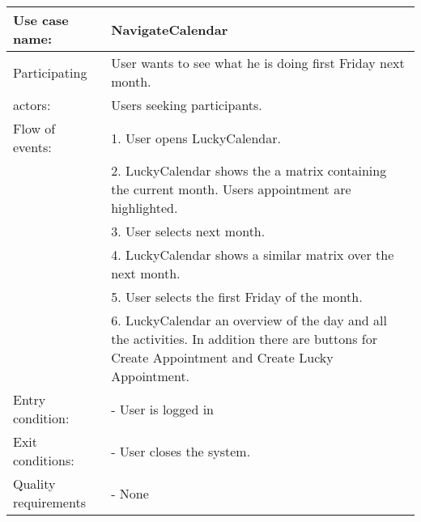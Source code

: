 {\tabulinesep=1.2mm
\begin{tabu}{ | p{3cm} | p{13cm} |}
    \hline
    Use case name: 			& 		NavigateCalendar\\ \hline
    Participating  			& 		User wants to see what he is doing first Friday next month. \\
    actors:					&		Users seeking participants.\\ \hline
    Flow of events: 		& 		1. User opens LuckyCalendar. \\
							&		2. LuckyCalendar shows the a matrix containing the current month. Users appointment are highlighted.\\
							&		3. User selects next month.\\
							&		4. LuckyCalendar shows a similar matrix over the next month.\\
							&		5. User selects the first Friday of the month.\\
							&		6. LuckyCalendar an overview of the day and all the activities. In addition there are buttons for Create Appointment and Create Lucky Appointment.\\ \hline
    Entry condition: 		& 		- User is logged in  \\ \hline
	Exit conditions: 		&		- User closes the system.\\ \hline
	Quality requirements	&	 	- None \\\hline
\end{tabu}
}